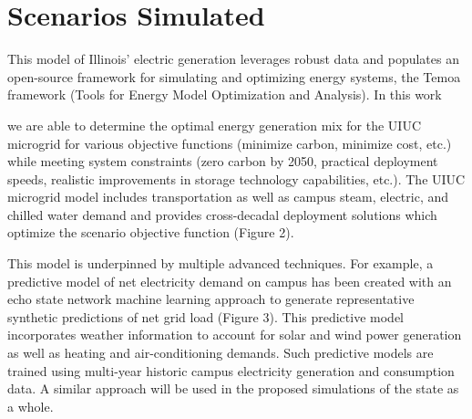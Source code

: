 \section{Scenarios Simulated}\label{sec:simulations}

This model of Illinois' electric generation leverages robust data and populates 
an open-source framework for simulating and optimizing energy systems, 
the Temoa framework (Tools for Energy Model Optimization and Analysis). 
In this work 

we are able to determine the optimal energy generation mix 
for the UIUC microgrid for various objective functions (minimize carbon, 
minimize cost, etc.) while meeting system constraints (zero carbon by 2050, 
practical deployment speeds, realistic improvements in storage technology 
capabilities, etc.). The UIUC microgrid model includes transportation as well 
as campus steam, electric, and chilled water demand and provides cross-decadal 
deployment solutions which optimize the scenario objective function (Figure 2).

This model is underpinned by multiple advanced techniques. For example, a 
predictive model of net electricity demand on campus has been created with an 
echo state network machine learning approach to generate representative 
synthetic predictions of net grid load (Figure 3). This predictive model 
incorporates weather information to account for solar and wind power generation 
as well as heating and air-conditioning demands. Such predictive models are 
trained using multi-year historic campus electricity generation and consumption 
data. A similar approach will be used in the proposed simulations of the state 
as a whole.




